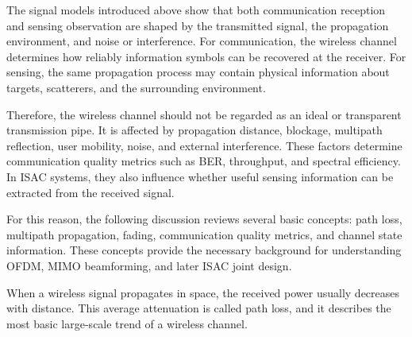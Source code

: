 
The signal models introduced above show that both communication reception and
sensing observation are shaped by the transmitted signal,
the propagation environment,
and noise or interference.
For communication,
the wireless channel determines how reliably information symbols can be
recovered at the receiver.
For sensing,
the same propagation process may contain physical information about targets,
scatterers,
and the surrounding environment.

Therefore,
the wireless channel should not be regarded as an ideal or transparent
transmission pipe.
It is affected by propagation distance,
blockage,
multipath reflection,
user mobility,
noise,
and external interference.
These factors determine communication quality metrics such as BER,
throughput,
and spectral efficiency.
In ISAC systems,
they also influence whether useful sensing information can be extracted from
the received signal.

For this reason,
the following discussion reviews several basic concepts:
path loss,
multipath propagation,
fading,
communication quality metrics,
and channel state information.
These concepts provide the necessary background for understanding OFDM,
MIMO beamforming,
and later ISAC joint design.
 

When a wireless signal propagates in space, the received power usually
decreases with distance.
This average attenuation is called path loss, and it describes the most basic
large-scale trend of a wireless channel.

